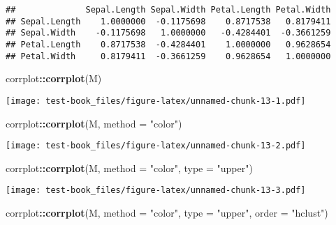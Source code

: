 \documentclass[]{book}
\newenvironment{Shaded}{\begin{snugshade}}{\end{snugshade}}
\newcommand{\DataTypeTok}[1]{\textcolor[rgb]{0.13,0.29,0.53}{#1}}
\newcommand{\KeywordTok}[1]{\textcolor[rgb]{0.13,0.29,0.53}{\textbf{#1}}}
\newcommand{\NormalTok}[1]{#1}
\newcommand{\OperatorTok}[1]{\textcolor[rgb]{0.81,0.36,0.00}{\textbf{#1}}}
\newcommand{\StringTok}[1]{\textcolor[rgb]{0.31,0.60,0.02}{#1}}
\begin{document}
\begin{verbatim}
##              Sepal.Length Sepal.Width Petal.Length Petal.Width
## Sepal.Length    1.0000000  -0.1175698    0.8717538   0.8179411
## Sepal.Width    -0.1175698   1.0000000   -0.4284401  -0.3661259
## Petal.Length    0.8717538  -0.4284401    1.0000000   0.9628654
## Petal.Width     0.8179411  -0.3661259    0.9628654   1.0000000
\end{verbatim}

\begin{Shaded}
\end{Shaded}

\begin{Shaded}
\begin{Highlighting}[]
\NormalTok{corrplot}\OperatorTok{::}\KeywordTok{corrplot}\NormalTok{(M)}
\end{Highlighting}
\end{Shaded}

\texttt{[image: test-book\_files/figure-latex/unnamed-chunk-13-1.pdf]}

\begin{Shaded}
\begin{Highlighting}[]
\NormalTok{corrplot}\OperatorTok{::}\KeywordTok{corrplot}\NormalTok{(M, }\DataTypeTok{method =} \StringTok{"color"}\NormalTok{)}
\end{Highlighting}
\end{Shaded}

\texttt{[image: test-book\_files/figure-latex/unnamed-chunk-13-2.pdf]}

\begin{Shaded}
\begin{Highlighting}[]
\NormalTok{corrplot}\OperatorTok{::}\KeywordTok{corrplot}\NormalTok{(M, }\DataTypeTok{method =} \StringTok{"color"}\NormalTok{, }\DataTypeTok{type =} \StringTok{"upper"}\NormalTok{)}
\end{Highlighting}
\end{Shaded}

\texttt{[image: test-book\_files/figure-latex/unnamed-chunk-13-3.pdf]}

\begin{Shaded}
\begin{Highlighting}[]
\NormalTok{corrplot}\OperatorTok{::}\KeywordTok{corrplot}\NormalTok{(M, }\DataTypeTok{method =} \StringTok{"color"}\NormalTok{, }\DataTypeTok{type =} \StringTok{"upper"}\NormalTok{, }\DataTypeTok{order =} \StringTok{"hclust"}\NormalTok{)}
\end{Highlighting}
\end{Shaded}
\end{document}
